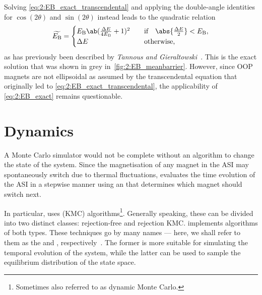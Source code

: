 Solving \cref{eq:2:EB_exact_transcendental} and applying the double-angle identities for $\cos(2\theta)$ and $\sin(2\theta)$ instead leads to the quadratic relation %
\begin{equation}
	\label{eq:2:EB_exact}
	\widetilde{E_\mathrm{B}} = \begin{cases}
		E_\mathrm{B} \ab(\frac{\Delta E}{4 E_\mathrm{B}} + 1)^2 & \quad \text{if} \quad \abs{\frac{\Delta E}{2}} < E_\mathrm{B}, \\
		\Delta E & \quad \text{otherwise,} \\
	\end{cases}
\end{equation}
as has previously been described by \textit{Tannous and Gieraltowski}~\cite{StonerWohlfarth2008}.
This is the exact solution that was shown in grey in~\cref{fig:2:EB_meanbarrier}.
However, since OOP magnets are not ellipsoidal as assumed by the transcendental equation that originally led to \cref{eq:2:EB_exact_transcendental}, the applicability of \cref{eq:2:EB_exact} remains questionable.

\newpage %
\section{Dynamics}\label{sec:2:Dynamics}
A Monte Carlo simulator would not be complete without an algorithm to change the state of the system.
Since the magnetisation of any magnet in the ASI may spontaneously switch due to thermal fluctuations, \hotspice evaluates the time evolution of the ASI in a stepwise manner using an  that determines which magnet should switch next. \par
In particular, \hotspice uses  (KMC) algorithms\footnote{Sometimes also referred to as dynamic Monte Carlo.}.
Generally speaking, these can be divided into two distinct classes: rejection-free and rejection KMC.
\hotspice implements algorithms of both types.
These techniques go by many names --- here, we shall refer to them as the \emph{} and \emph{}, respectively~\cite{gillespie1976general,PhysicalTimeKMC}.
The former is more suitable for simulating the temporal evolution of the system, while the latter can be used to sample the equilibrium distribution of the state space.

